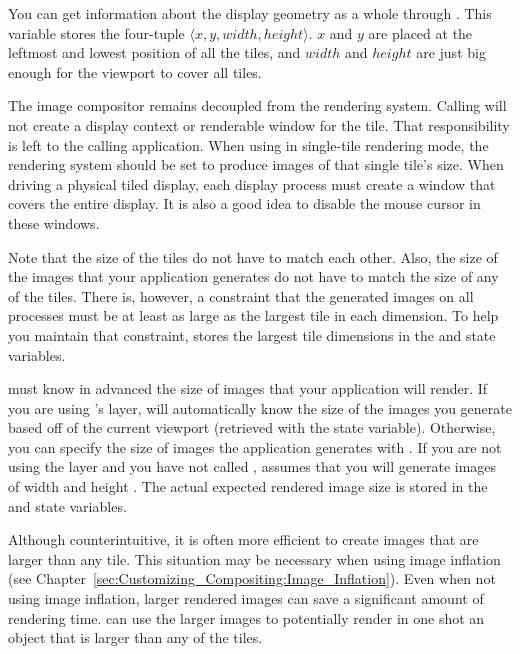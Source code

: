 You can get information about the display geometry as a whole through
.  This variable stores the four-tuple
$\langle x, y, width, height \rangle$.  $x$ and $y$ are placed at the
leftmost and lowest position of all the tiles, and $width$ and $height$ are
just big enough for the viewport to cover all tiles.

The \IceT image compositor remains decoupled from the rendering system.
Calling  will not create a display context or renderable
window for the tile.  That responsibility is left to the calling
application.  When using \IceT in single-tile
rendering mode, the rendering system should be set to produce images of
that single tile's size.  When driving a physical tiled display, each
display process must create a window that covers the entire display.  It is
also a good idea to disable the mouse cursor in these windows.

Note that the size of the tiles do not have to match each other.  Also, the
size of the images that your application generates do not have to match the
size of any of the tiles.  There is, however, a constraint that the
generated images on all processes must be at least as large as the largest
tile in each dimension.  To help you maintain that constraint, \IceT stores
the largest tile dimensions in the  and
 state variables.

\IceT must know in advanced the size of images that your application will
render.  If you are using \IceT's \OpenGL layer, \IceT will automatically
know the size of the images you generate based off of the current \OpenGL
viewport (retrieved with the  \OpenGL state variable).
Otherwise, you can specify the size of images the application generates
with .  If you are not using the \OpenGL
layer and you have not called , \IceT assumes
that you will generate images of width  and
height .  The actual expected rendered image
size is stored in the  and
 state variables.

Although counterintuitive, it is often more efficient to create images that
are larger than any tile.  This situation may be necessary when using
image inflation (see
Chapter~\ref{sec:Customizing_Compositing:Image_Inflation}).  Even when not
using image inflation, larger rendered images can save a significant amount
of rendering time.  \IceT can use the larger images to potentially render
in one shot an object that is larger than any of the tiles.

